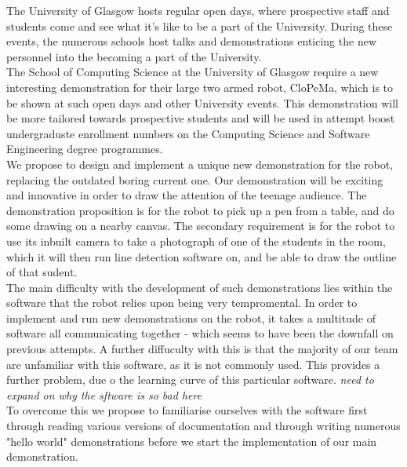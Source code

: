 \documentclass[preprint,12pt]{elsarticle}
\begin{document}
\noindent The University of Glasgow hosts regular open days, where prospective staff and students come and see what it's like to be a part of the University. During these events, the numerous schools host talks and demonstrations enticing the new personnel into the becoming a part of the University. \\
The School of Computing Science at the University of Glasgow require a new interesting demonstration for their large two armed robot, CloPeMa, which is to be shown at such open days and other University events. This demonstration will be more tailored towards prospective students and will be used in attempt boost undergraduste enrollment numbers on the Computing Science and Software Engineering degree programmes.\\
We propose to design and implement a unique new demonstration for the robot, replacing the outdated boring current one. Our demonstration will be exciting and innovative in order to draw the attention of the teenage audience. The demonstration proposition is for the robot to pick up a pen from a table, and do some drawing on a nearby canvas. The secondary requirement is for the robot to use its inbuilt camera to take a photograph of one of the students in the room, which it will then run line detection software on, and be able to draw the outline of that sudent.\\
The main difficulty with the development of such demonstrations lies within the software that the robot relies upon being very tempromental. In order to implement and run new demonstrations on the robot, it takes a multitude of software all communicating together - which seems to have been the downfall on previous attempts. A further diffuculty with this is that the majority of our team are unfamiliar with this software, as it is not commonly used. This provides a further problem, due o the learning curve of this particular software. \textit{need to expand on why the sftware is so bad here} \\
To overcome this we propose to familiarise ourselves with the software first through reading various versions of documentation and through writing numerous "hello world" demonstrations before we start the implementation of our main demonstration.\\
\end{document}

